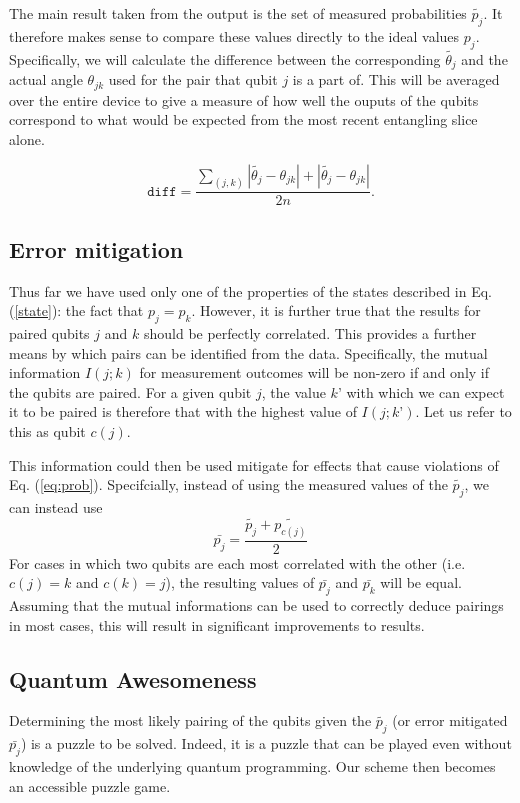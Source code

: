 \documentclass[aps,prl,twocolumn,showpacs,preprintnumbers]{revtex4-1}
\newcommand{\be}{\begin{equation}}
\newcommand{\ee}{\end{equation}}
\begin{document}
The main result taken from the output is the set of measured probabilities $\tilde{p_j}$. It therefore makes sense to compare these values directly to the ideal values $p_j$. Specifically, we will calculate the difference between the corresponding $\tilde{\theta_j}$ and the actual angle $\theta_{jk}$ used for the pair that qubit $j$ is a part of. This will be averaged over the entire device to give a measure of how well the ouputs of the qubits correspond to what would be expected from the most recent entangling slice alone.

\be
\mathtt{diff} = \frac{ \sum_{(j,k)} | \tilde{\theta_j} - \theta_{jk} | + | \tilde{\theta_j} - \theta_{jk} | }{ 2 n }.
\ee

\subsection{Error mitigation}

Thus far we have used only one of the properties of the states described in Eq. (\ref{state}): the fact that $p_j=p_k$. However, it is further true that the results for paired qubits $j$ and $k$ should be perfectly correlated. This provides a further means by which pairs can be identified from the data. Specifically, the mutual information $I(j;k)$ for measurement outcomes will be non-zero if and only if the qubits are paired. For a given qubit $j$, the value $k’$ with which we can expect it to be paired is therefore that with the highest value of $I(j;k’)$. Let us refer to this as qubit $c(j)$.

This information could then be used mitigate for effects that cause violations of Eq. (\ref{eq:prob}). Specifcially, instead of using the measured values of the $\tilde{p_j}$, we can instead use
\be
\bar{p_j} = \frac{ \tilde{p_j} + \tilde{p_{c(j)}} }{2}
\ee
For cases in which two qubits are each most correlated with the other (i.e. $c(j)=k$ and $c(k)=j$), the resulting values of $\bar{p_j}$ and $\bar{p_k}$ will be equal. Assuming that the mutual informations can be used to correctly deduce pairings in most cases, this will result in significant improvements to results.

\subsection{Quantum Awesomeness}

Determining the most likely pairing of the qubits given the $\tilde{p_j}$ (or error mitigated $\bar{p_j}$) is a puzzle to be solved. Indeed, it is a puzzle that can be played even without knowledge of the underlying quantum programming. Our scheme then becomes an accessible puzzle game.
\end{document}
